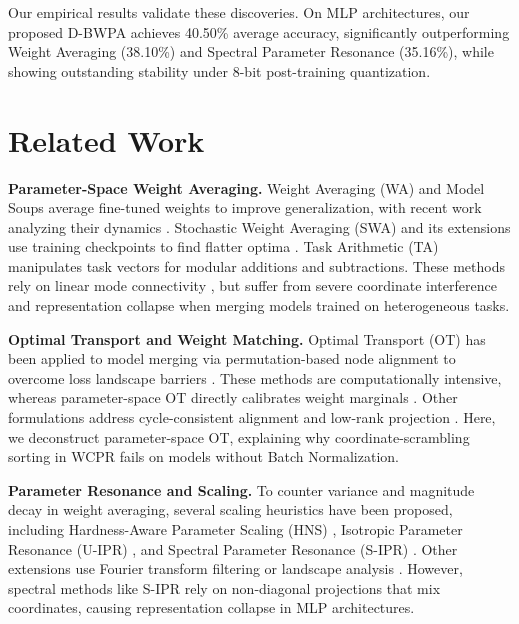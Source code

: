 \documentclass{article}
\theoremstyle{plain}
\theoremstyle{definition}
\theoremstyle{remark}
\begin{document}
Our empirical results validate these discoveries. On MLP architectures, our proposed D-BWPA achieves 40.50\% average accuracy, significantly outperforming Weight Averaging (38.10\%) and Spectral Parameter Resonance (35.16\%), while showing outstanding stability under 8-bit post-training quantization.

\section{Related Work}
\label{sec:related}

\textbf{Parameter-Space Weight Averaging.}
Weight Averaging (WA) \cite{fedavg} and Model Soups \cite{model_soup} average fine-tuned weights to improve generalization, with recent work analyzing their dynamics \cite{moralesbrotons2024_exponential_moving, wang2024_a_unified}. Stochastic Weight Averaging (SWA) and its extensions use training checkpoints to find flatter optima \cite{weight_averaging, maddox2019_a_simple}. Task Arithmetic (TA) \cite{task_arithmetic} manipulates task vectors for modular additions and subtractions. These methods rely on linear mode connectivity \cite{linear_mode_connectivity}, but suffer from severe coordinate interference and representation collapse when merging models trained on heterogeneous tasks.

\textbf{Optimal Transport and Weight Matching.}
Optimal Transport (OT) has been applied to model merging via permutation-based node alignment to overcome loss landscape barriers \cite{git_rebasin, zipit, fedma}. These methods are computationally intensive, whereas parameter-space OT directly calibrates weight marginals \cite{wcpr}. Other formulations address cycle-consistent alignment \cite{crisostomi2024_c2m3_cycleconsistent} and low-rank projection \cite{panariello2025_accurate_and}. Here, we deconstruct parameter-space OT, explaining why coordinate-scrambling sorting in WCPR \cite{wcpr} fails on models without Batch Normalization.

\textbf{Parameter Resonance and Scaling.}
To counter variance and magnitude decay in weight averaging, several scaling heuristics have been proposed, including Hardness-Aware Parameter Scaling (HNS) \cite{hns}, Isotropic Parameter Resonance (U-IPR) \cite{ipr}, and Spectral Parameter Resonance (S-IPR) \cite{s_ipr}. Other extensions use Fourier transform filtering \cite{zheng2024_freemerging_fourier} or landscape analysis \cite{khan2024_sok_on}. However, spectral methods like S-IPR rely on non-diagonal projections that mix coordinates, causing representation collapse in MLP architectures.
\end{document}

